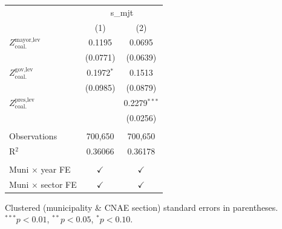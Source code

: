 \begingroup
\centering
\begin{tabular}{lcc}
   \toprule
    & \multicolumn{2}{c}{s\_mjt}\\
                                           & (1)           & (2)\\  
   \midrule 
   $Z^{\text{mayor,lev}}_{\text{coal.}}$   & 0.1195        & 0.0695\\   
                                           & (0.0771)      & (0.0639)\\   
   $Z^{\text{gov,lev}}_{\text{coal.}}$     & 0.1972$^{*}$  & 0.1513\\   
                                           & (0.0985)      & (0.0879)\\   
   $Z^{\text{pres,lev}}_{\text{coal.}}$    &               & 0.2279$^{***}$\\   
                                           &               & (0.0256)\\   
    \\
   Observations                            & 700,650       & 700,650\\  
   R$^2$                                   & 0.36066       & 0.36178\\  
    \\
   Muni $\times$ year FE                   & $\checkmark$  & $\checkmark$\\   
   Muni $\times$ sector FE                 & $\checkmark$  & $\checkmark$\\   
   \bottomrule
\end{tabular}
 
\par \raggedright 
Clustered (municipality \& CNAE section) standard errors in parentheses. $^{***}p<0.01$, $^{**}p<0.05$, $^{*}p<0.10$.
\par\endgroup
